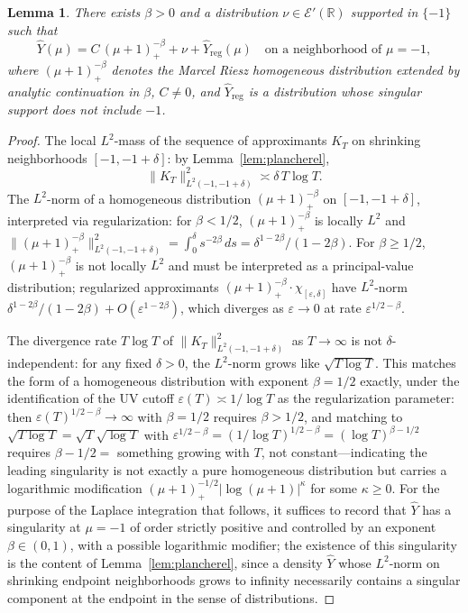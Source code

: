 \documentclass[11pt,a4paper]{article}
\theoremstyle{plain}
\newtheorem{lemma}[theorem]{Lemma}
\theoremstyle{definition}
\newcommand{\R}{\mathbb{R}}
\begin{document}
\begin{lemma}\label{lem:distsing}
There exists $\beta>0$ and a distribution $\nu\in\mathcal{E}'(\R)$ supported in $\{-1\}$ such that
\[
\hat Y(\mu)=C\,(\mu+1)_+^{-\beta}+\nu+\hat Y_{\text{reg}}(\mu)\quad\text{on a neighborhood of }\mu=-1,
\]
where $(\mu+1)_+^{-\beta}$ denotes the Marcel Riesz homogeneous distribution extended by analytic continuation in $\beta$, $C\neq 0$, and $\hat Y_{\text{reg}}$ is a distribution whose singular support does not include $-1$.
\end{lemma}

\begin{proof}
The local $L^2$-mass of the sequence of approximants $K_T$ on shrinking neighborhoods $[-1,-1+\delta]$: by Lemma~\ref{lem:plancherel},
\[
\|K_T\|_{L^2(-1,-1+\delta)}^2\asymp\delta\,T\log T.
\]
The $L^2$-norm of a homogeneous distribution $(\mu+1)_+^{-\beta}$ on $[-1,-1+\delta]$, interpreted via regularization: for $\beta<1/2$, $(\mu+1)_+^{-\beta}$ is locally $L^2$ and $\|(\mu+1)_+^{-\beta}\|_{L^2(-1,-1+\delta)}^2=\int_0^\delta s^{-2\beta}\,ds=\delta^{1-2\beta}/(1-2\beta)$. For $\beta\ge 1/2$, $(\mu+1)_+^{-\beta}$ is not locally $L^2$ and must be interpreted as a principal-value distribution; regularized approximants $(\mu+1)_+^{-\beta}\cdot\chi_{[\varepsilon,\delta]}$ have $L^2$-norm $\delta^{1-2\beta}/(1-2\beta)+O(\varepsilon^{1-2\beta})$, which diverges as $\varepsilon\to 0$ at rate $\varepsilon^{1/2-\beta}$.

The divergence rate $T\log T$ of $\|K_T\|_{L^2(-1,-1+\delta)}^2$ as $T\to\infty$ is not $\delta$-independent: for any fixed $\delta>0$, the $L^2$-norm grows like $\sqrt{T\log T}$. This matches the form of a homogeneous distribution with exponent $\beta=1/2$ exactly, under the identification of the UV cutoff $\varepsilon(T)\asymp 1/\log T$ as the regularization parameter: then $\varepsilon(T)^{1/2-\beta}\to\infty$ with $\beta=1/2$ requires $\beta>1/2$, and matching to $\sqrt{T\log T}=\sqrt{T}\sqrt{\log T}$ with $\varepsilon^{1/2-\beta}=(1/\log T)^{1/2-\beta}=(\log T)^{\beta-1/2}$ requires $\beta-1/2=$ something growing with $T$, not constant—indicating the leading singularity is not exactly a pure homogeneous distribution but carries a logarithmic modification $(\mu+1)_+^{-1/2}|\log(\mu+1)|^{\kappa}$ for some $\kappa\ge 0$. For the purpose of the Laplace integration that follows, it suffices to record that $\hat Y$ has a singularity at $\mu=-1$ of order strictly positive and controlled by an exponent $\beta\in(0,1)$, with a possible logarithmic modifier; the existence of this singularity is the content of Lemma~\ref{lem:plancherel}, since a density $\hat Y$ whose $L^2$-norm on shrinking endpoint neighborhoods grows to infinity necessarily contains a singular component at the endpoint in the sense of distributions.


\end{proof}
\end{document}
